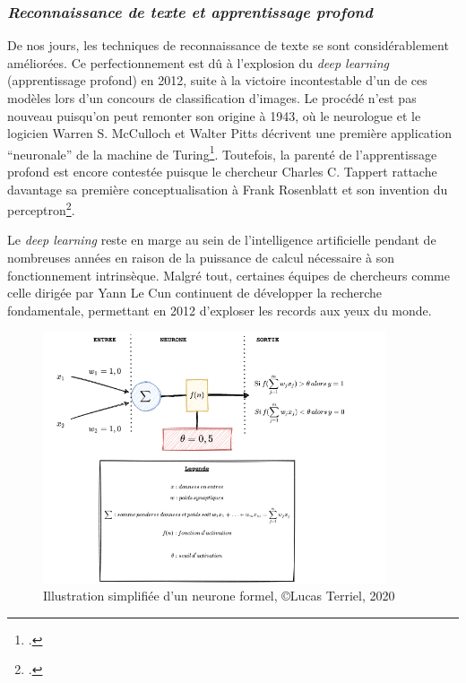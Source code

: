 	\subsubsection{\textit{Reconnaissance de texte et apprentissage profond}}
	
	De nos jours, les techniques de reconnaissance de texte se sont considérablement améliorées. Ce perfectionnement est dû à l’explosion du \textit{deep learning} (apprentissage profond) en 2012, suite à la victoire incontestable d'un de ces modèles lors d'un concours de classification d'images. Le procédé n'est pas nouveau puisqu'on peut remonter son origine à 1943, où le neurologue et le logicien Warren S. McCulloch et Walter Pitts décrivent une première application \enquote{neuronale} de la machine de Turing\footcite{mccullochLogicalCalculusIdeas1943}. Toutefois, la parenté de l'apprentissage profond est encore contestée puisque le chercheur Charles C. Tappert rattache davantage sa première conceptualisation à Frank Rosenblatt et son invention du perceptron\footcite[Il met en place un système probabiliste de stockage et de classifications de l'information s'appuyant sur le modèle d'un réseau neuronal][]{tappertWhoFatherDeep2019}.
	
	Le \textit{deep learning} reste en marge au sein de l'intelligence artificielle pendant de nombreuses années en raison de la puissance de calcul nécessaire à son fonctionnement intrinsèque. Malgré tout, certaines équipes de chercheurs comme celle dirigée par Yann Le Cun continuent de développer la recherche fondamentale, permettant en 2012 d'exploser les records aux yeux du monde.
	
	\begin{figure}[h!]
	    \centering
	    \includegraphics[width=0.9\textwidth]{annexes/graph/neurone_formel.png}
	    \caption{Illustration simplifiée d’un neurone formel, ©Lucas Terriel, 2020}
	    \label{fig:neurone}
	\end{figure}
	
